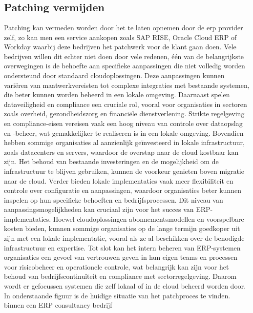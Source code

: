 \documentclass[dutch,dit,thesis]{hogentreport}
\begin{document}
\chapter{}
\label{ch:corpus}

\section{Patching vermijden}

Patching kan vermeden worden door het te laten opnemen door de erp provider zelf, zo kan men een service aankopen zoals SAP RISE, Oracle Cloud ERP of Workday waarbij deze bedrijven het patchwerk voor de klant gaan doen. Vele bedrijven
 willen dit echter niet doen door vele redenen, één van de belangrijkste overwegingen is de behoefte aan specifieke aanpassingen die niet volledig worden ondersteund door standaard cloudoplossingen. 
 Deze aanpassingen kunnen variëren van maatwerkvereisten tot complexe integraties met bestaande systemen, die beter kunnen worden beheerd in een lokale omgeving.
Daarnaast spelen dataveiligheid en compliance een cruciale rol, vooral voor organisaties in sectoren zoals overheid, gezondheidszorg en financiële dienstverlening.
 Strikte regelgeving en compliance-eisen vereisen vaak een hoog niveau van controle over dataopslag en -beheer, wat gemakkelijker te realiseren is in een lokale omgeving.
Bovendien hebben sommige organisaties al aanzienlijk geïnvesteerd in lokale infrastructuur, zoals datacenters en servers, waardoor de overstap naar de cloud kostbaar kan zijn.
 Het behoud van bestaande investeringen en de mogelijkheid om de infrastructuur te blijven gebruiken, kunnen de voorkeur genieten boven migratie naar de cloud.
Verder bieden lokale implementaties vaak meer flexibiliteit en controle over configuratie en aanpassingen, waardoor organisaties beter kunnen inspelen op hun specifieke behoeften en 
bedrijfsprocessen. Dit niveau van aanpassingsmogelijkheden kan cruciaal zijn voor het succes van ERP-implementaties.
Hoewel cloudoplossingen abonnementsmodellen en voorspelbare kosten bieden, kunnen sommige organisaties op de lange termijn goedkoper uit zijn met een lokale implementatie, vooral als
 ze al beschikken over de benodigde infrastructuur en expertise.
Tot slot kan het intern beheren van ERP-systemen organisaties een gevoel van vertrouwen geven in hun eigen teams en processen voor risicobeheer en operationele controle, wat belangrijk 
kan zijn voor het behoud van bedrijfscontinuïteit en compliance met sectorregelgeving. Daarom wordt er gefocussen systemen die zelf lokaal of in de cloud beheerd worden door. In onderstaande figuur is de huidige situatie van het patchproces te vinden. binnen een ERP consultancy bedrijf \\
\end{document}
